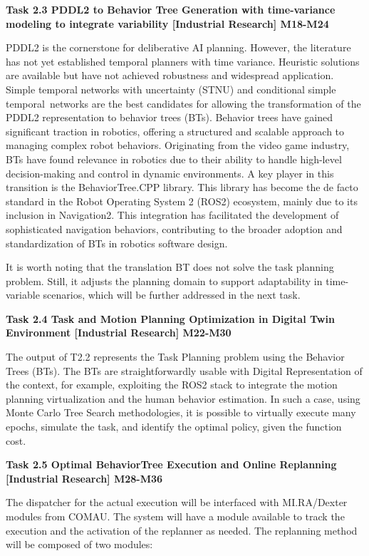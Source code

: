 \begin{longtable}[]
{\begin{minipage}[t]{\linewidth}
\textbf{Task 2.3 PDDL2 to Behavior Tree Generation with time-variance
modeling to integrate variability {[}Industrial Research{]} M18-M24}

PDDL2 is the cornerstone for deliberative AI planning. However, the
literature has not yet established temporal planners with time variance.
Heuristic solutions are available but have not achieved robustness and
widespread application. Simple temporal networks with uncertainty (STNU)
and conditional simple temporal~networks are the best candidates for
allowing the transformation of the PDDL2 representation to behavior
trees (BTs). Behavior trees have gained significant traction in
robotics, offering a structured and scalable approach to managing
complex robot behaviors. Originating from the video game industry, BTs
have found relevance in robotics due to their ability to handle
high-level decision-making and control in dynamic environments. A key
player in this transition is the BehaviorTree.CPP library. This library
has become the de facto standard in the Robot Operating System 2 (ROS2)
ecosystem, mainly due to its inclusion in Navigation2. This integration
has facilitated the development of sophisticated navigation behaviors,
contributing to the broader adoption and standardization of BTs in
robotics software design.

It is worth noting that the translation BT does not solve the task
planning problem. Still, it adjusts the planning domain to support
adaptability in time-variable scenarios, which will be further addressed
in the next task.

\textbf{Task 2.4 Task and Motion Planning Optimization in Digital Twin
Environment {[}Industrial Research{]} M22-M30}

The output of T2.2 represents the Task Planning problem using the
Behavior Trees (BTs). The BTs are straightforwardly usable with Digital
Representation of the context, for example, exploiting the ROS2 stack to
integrate the motion planning virtualization and the human behavior
estimation. In such a case, using Monte Carlo Tree Search methodologies,
it is possible to virtually execute many epochs, simulate the task, and
identify the optimal policy, given the function cost.

\textbf{Task 2.5 Optimal BehaviorTree Execution and Online Replanning
{[}Industrial Research{]} M28-M36}

The dispatcher for the actual execution will be interfaced with
MI.RA/Dexter modules from COMAU. The system will have a module available
to track the execution and the activation of the replanner as needed.
The replanning method will be composed of two modules:


\end{minipage}}
\end{longtable}
